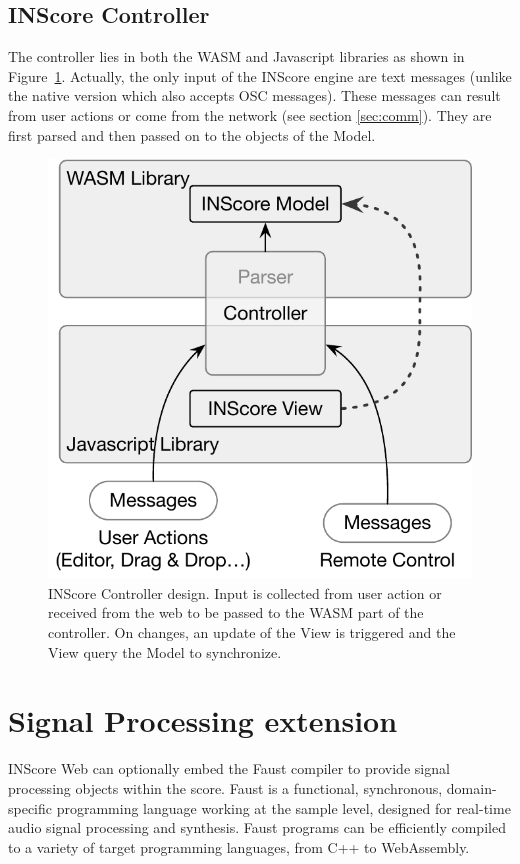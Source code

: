 \documentclass{article}
\begin{document}
\subsection{INScore Controller}

The controller lies in both the WASM and Javascript libraries as shown in Figure~\ref{fig:ctrl}. Actually, the only input of the INScore engine are text messages (unlike the native version which also accepts OSC messages). These messages can result from user actions or come from the network (see section \ref{sec:comm}). They are first parsed and then passed on to the objects of the Model.
\begin{figure}[H]
\centering
\includegraphics[width=0.7\columnwidth]{rsrc/controller.pdf}
\caption{INScore Controller design. Input is collected from user action or received from the web to be passed to the WASM part of the controller. On changes, an update of the View is triggered and the View query the Model to synchronize. }
\label{fig:ctrl}
\end{figure}


\section{Signal Processing extension}\label{sec:faust}

INScore Web can optionally embed the Faust compiler to provide signal processing objects within the score. 
Faust \cite{orlarey:hal-02159014} is a functional, synchronous, domain-specific programming language working at the sample level, designed for real-time audio signal processing and synthesis. Faust programs can be efficiently compiled to a variety of target programming languages, from C++ to WebAssembly. 
\end{document}
